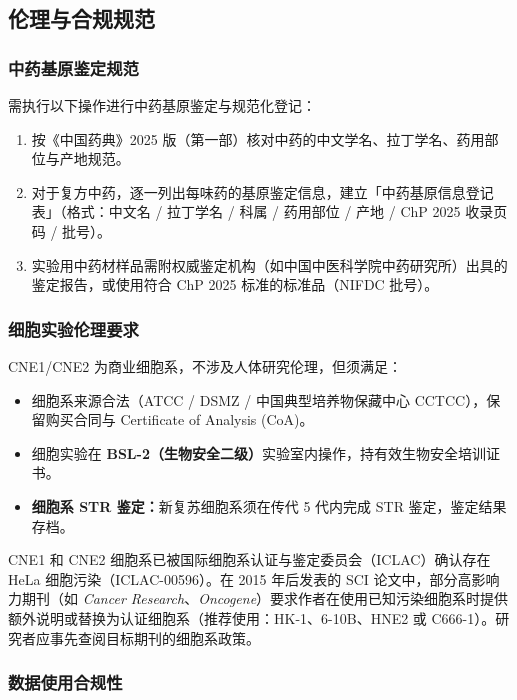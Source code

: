 \documentclass[12pt,a4paper,twoside]{article}
\begin{document}
\subsection{伦理与合规规范}
\label{sec:module1_ethics}

\subsubsection{中药基原鉴定规范}

需执行以下操作进行中药基原鉴定与规范化登记：
\begin{enumerate}
  \item 按《中国药典》2025 版（第一部）核对中药的中文学名、拉丁学名、药用部位与产地规范。
  \item 对于复方中药，逐一列出每味药的基原鉴定信息，建立「中药基原信息登记表」（格式：中文名 / 拉丁学名 / 科属 / 药用部位 / 产地 / ChP 2025 收录页码 / 批号）。
  \item 实验用中药材样品需附权威鉴定机构（如中国中医科学院中药研究所）出具的鉴定报告，或使用符合 ChP 2025 标准的标准品（NIFDC 批号）。
\end{enumerate}

\subsubsection{细胞实验伦理要求}

CNE1/CNE2 为商业细胞系，不涉及人体研究伦理，但须满足：
\begin{itemize}
  \item 细胞系来源合法（ATCC / DSMZ / 中国典型培养物保藏中心 CCTCC），保留购买合同与 Certificate of Analysis (CoA)。
  \item 细胞实验在 \textbf{BSL-2（生物安全二级）}实验室内操作，持有效生物安全培训证书。
  \item \textbf{细胞系 STR 鉴定：}新复苏细胞系须在传代 5 代内完成 STR 鉴定，鉴定结果存档。
\end{itemize}

\begin{warningbox}
CNE1 和 CNE2 细胞系已被国际细胞系认证与鉴定委员会（ICLAC）确认存在 HeLa 细胞污染（ICLAC-00596）。在 2015 年后发表的 SCI 论文中，部分高影响力期刊（如 \textit{Cancer Research}、\textit{Oncogene}）要求作者在使用已知污染细胞系时提供额外说明或替换为认证细胞系（推荐使用：HK-1、6-10B、HNE2 或 C666-1）。研究者应事先查阅目标期刊的细胞系政策。
\end{warningbox}

\subsubsection{数据使用合规性}
\end{document}
